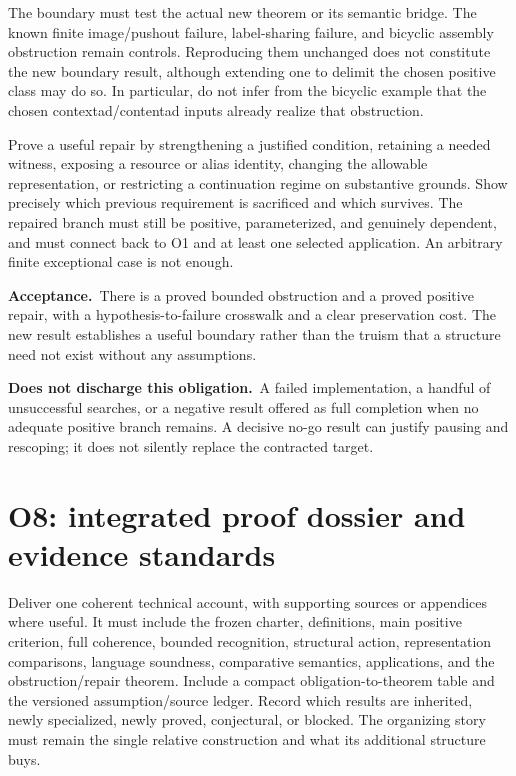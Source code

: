 \documentclass[11pt,a4paper]{article}
\newcommand{\accept}{\par\textbf{Acceptance.}\ }
\newcommand{\notaccepted}{\par\textbf{Does not discharge this obligation.}\ }
\begin{document}
The boundary must test the actual new theorem or its semantic bridge. The
known finite image/pushout failure, label-sharing failure, and bicyclic
assembly obstruction remain controls. Reproducing them unchanged does not
constitute the new boundary result, although extending one to delimit the
chosen positive class may do so. In particular, do not infer from the
bicyclic example that the chosen contextad/contentad inputs already realize
that obstruction.

Prove a useful repair by strengthening a justified condition, retaining a
needed witness, exposing a resource or alias identity, changing the allowable
representation, or restricting a continuation regime on substantive grounds.
Show precisely which previous requirement is sacrificed and which survives.
The repaired branch must still be positive, parameterized, and genuinely
dependent, and must connect back to O1 and at least one selected application.
An arbitrary finite exceptional case is not enough.

\accept There is a proved bounded obstruction and a proved positive repair,
with a hypothesis-to-failure crosswalk and a clear preservation cost. The
new result establishes a useful boundary rather than the truism that a
structure need not exist without any assumptions.

\notaccepted A failed implementation, a handful of unsuccessful searches,
or a negative result offered as full completion when no adequate positive
branch remains. A decisive no-go result can justify pausing and rescoping;
it does not silently replace the contracted target.

\section{O8: integrated proof dossier and evidence standards}\label{sec:o8}

Deliver one coherent technical account, with supporting sources or appendices
where useful. It must include the frozen charter, definitions, main positive
criterion, full coherence, bounded recognition, structural action,
representation comparisons, language soundness, comparative semantics,
applications, and the obstruction/repair theorem. Include a compact
obligation-to-theorem table and the versioned assumption/source ledger.
Record which results are inherited, newly specialized, newly proved,
conjectural, or blocked. The organizing story must remain the single relative
construction and what its additional structure buys.
\end{document}
